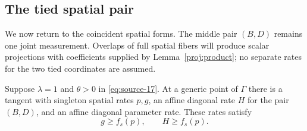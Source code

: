 \subsection{The tied spatial pair}

We now return to the coincident spatial forms.  The middle pair
$(B,D)$ remains one joint measurement.  Overlaps of full spatial
fibers will produce scalar projections with coefficients supplied
by Lemma~\ref{proj:product}; no separate rates for the two tied
coordinates are assumed.

\begin{proposition}
\label{proj:tied}
Suppose $\lambda=1$ and $\theta>0$ in
\eqref{eq:source-17}. At a generic point of $\Gamma$ there is a
tangent with singleton spatial rates $p,g$, an affine diagonal
rate $H$ for the pair $(B,D)$, and an affine diagonal parameter
rate. These rates satisfy
\begin{equation}
 g\ge f_s(p),\qquad H\ge f_s(p).
 \label{eq:source-18}
\end{equation}
\end{proposition}

